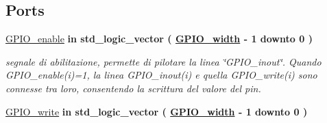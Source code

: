 \subsection*{Ports}
 \begin{DoxyCompactItemize}
\item 
\hypertarget{class_g_p_i_oarray_ga11dd30ea6a502615af8dccf7a8bc78fe}{\hyperlink{group___g_p_i_o-array_ga11dd30ea6a502615af8dccf7a8bc78fe}{G\+P\+I\+O\+\_\+enable}  {\bfseries {\bfseries \textcolor{vhdlchar}{in}\textcolor{vhdlchar}{ }}} {\bfseries \textcolor{vhdlchar}{std\+\_\+logic\+\_\+vector}\textcolor{vhdlchar}{ }\textcolor{vhdlchar}{(}\textcolor{vhdlchar}{ }\textcolor{vhdlchar}{ }\textcolor{vhdlchar}{ }\textcolor{vhdlchar}{ }{\bfseries \hyperlink{group___g_p_i_o-array_ga0b52ca75e9a6093b2b60d5e851803069}{G\+P\+I\+O\+\_\+width}} \textcolor{vhdlchar}{-\/}\textcolor{vhdlchar}{ } \textcolor{vhdldigit}{1} \textcolor{vhdlchar}{ }\textcolor{vhdlchar}{downto}\textcolor{vhdlchar}{ }\textcolor{vhdlchar}{ } \textcolor{vhdldigit}{0} \textcolor{vhdlchar}{ }\textcolor{vhdlchar}{)}\textcolor{vhdlchar}{ }} }\label{class_g_p_i_oarray_ga11dd30ea6a502615af8dccf7a8bc78fe}

\begin{DoxyCompactList}\small\item\em segnale di abilitazione, permette di pilotare la linea \char`\"{}\+G\+P\+I\+O\+\_\+inout\char`\"{}. Quando G\+P\+I\+O\+\_\+enable(i)=1, la linea G\+P\+I\+O\+\_\+inout(i) e quella G\+P\+I\+O\+\_\+write(i) sono connesse tra loro, consentendo la scrittura del valore del pin. \end{DoxyCompactList}\item 
\hypertarget{class_g_p_i_oarray_ga15a2a96cc1645c826c8ac6469f70c5c0}{\hyperlink{group___g_p_i_o-array_ga15a2a96cc1645c826c8ac6469f70c5c0}{G\+P\+I\+O\+\_\+write}  {\bfseries {\bfseries \textcolor{vhdlchar}{in}\textcolor{vhdlchar}{ }}} {\bfseries \textcolor{vhdlchar}{std\+\_\+logic\+\_\+vector}\textcolor{vhdlchar}{ }\textcolor{vhdlchar}{(}\textcolor{vhdlchar}{ }\textcolor{vhdlchar}{ }\textcolor{vhdlchar}{ }\textcolor{vhdlchar}{ }{\bfseries \hyperlink{group___g_p_i_o-array_ga0b52ca75e9a6093b2b60d5e851803069}{G\+P\+I\+O\+\_\+width}} \textcolor{vhdlchar}{-\/}\textcolor{vhdlchar}{ } \textcolor{vhdldigit}{1} \textcolor{vhdlchar}{ }\textcolor{vhdlchar}{downto}\textcolor{vhdlchar}{ }\textcolor{vhdlchar}{ } \textcolor{vhdldigit}{0} \textcolor{vhdlchar}{ }\textcolor{vhdlchar}{)}\textcolor{vhdlchar}{ }} }\label{class_g_p_i_oarray_ga15a2a96cc1645c826c8ac6469f70c5c0}


\end{DoxyCompactItemize}
